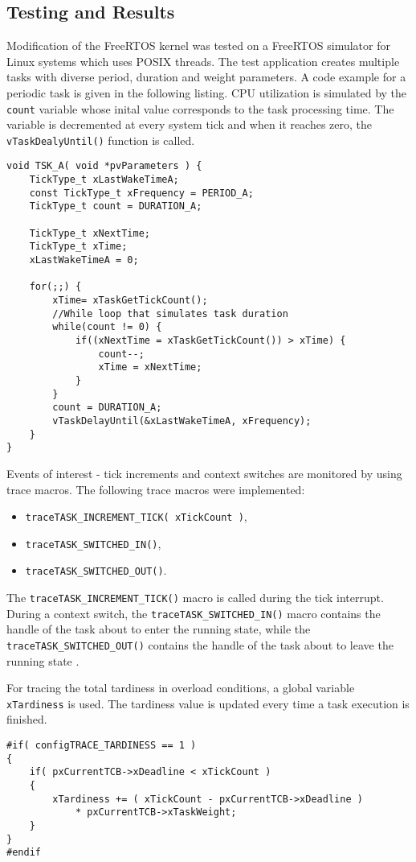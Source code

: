 \subsection{Testing and Results}
Modification of the FreeRTOS kernel was tested on a FreeRTOS simulator for Linux systems which uses POSIX threads.
The test application creates multiple tasks with diverse period, duration and weight parameters. 
A code example for a periodic task is given in the following listing.
CPU utilization is simulated by the \verb$count$ variable whose inital value corresponds to the task processing time. 
The variable is decremented at every system tick and when it reaches zero, the \verb$vTaskDealyUntil()$ function is called. 
\begin{lstlisting}[frame=none, label={switchcontext}, caption={Task function simulating a periodic task.}, captionpos=b]
void TSK_A( void *pvParameters ) {
    TickType_t xLastWakeTimeA;
    const TickType_t xFrequency = PERIOD_A;
    TickType_t count = DURATION_A;

    TickType_t xNextTime;
    TickType_t xTime;
    xLastWakeTimeA = 0;
    
    for(;;) {
        xTime= xTaskGetTickCount();
        //While loop that simulates task duration
        while(count != 0) {
            if((xNextTime = xTaskGetTickCount()) > xTime) {
                count--;
                xTime = xNextTime;
            }
        }
        count = DURATION_A;
        vTaskDelayUntil(&xLastWakeTimeA, xFrequency);
    }
}
\end{lstlisting}
Events of interest - tick increments and context switches are monitored by using trace macros. 
The following trace macros were implemented:
\begin{itemize}
	\item \verb$traceTASK_INCREMENT_TICK( xTickCount )$,
	\item \verb$traceTASK_SWITCHED_IN()$,
	\item \verb$traceTASK_SWITCHED_OUT()$.
\end{itemize}
The \verb$traceTASK_INCREMENT_TICK()$ macro is called during the tick interrupt.
During a context switch, the \verb$traceTASK_SWITCHED_IN()$ macro contains the handle of the task about to enter the running state, while the \verb$traceTASK_SWITCHED_OUT()$ contains the handle of the task about to leave the running state \cite{freertosref}. 

For tracing the total tardiness in overload conditions, a global variable \verb$xTardiness$ is used.
The tardiness value is updated every time a task execution is finished.
\begin{lstlisting}[frame=none, label={tardiness}, caption={Updating the \texttt{xTardiness} variable.}, captionpos=b]
#if( configTRACE_TARDINESS == 1 )
{
	if( pxCurrentTCB->xDeadline < xTickCount )
	{
		xTardiness += ( xTickCount - pxCurrentTCB->xDeadline ) 
			* pxCurrentTCB->xTaskWeight;
	}
}
#endif
\end{lstlisting}

